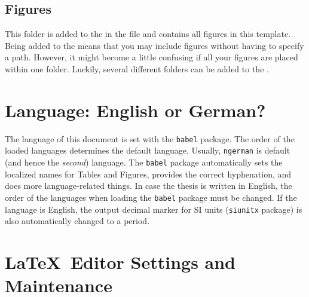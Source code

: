 \subsection{Figures}
This folder is added to the  in the  file and contains all figures in this template. Being added to the  means that you may include figures without having to specify a path. However, it might become a little confusing if all your figures are placed within one folder. Luckily, several different folders can be added to the .
\section{Language: English or German?}\label{sec:language}
The language of this document is set with the \verb+babel+ package. The order of the loaded languages determines the default language. Usually, \verb+ngerman+ is default (and hence the \emph{second}) language. The \verb+babel+ package automatically sets the localized names for Tables and Figures, provides the correct hyphenation, and does more language-related things. In case the thesis is written in English, the order of the languages when loading the \verb+babel+ package must be changed. If the language is English, the output decimal marker for SI units (\verb+siunitx+ package) is also automatically changed to a period.
\section{\LaTeX\ Editor Settings and Maintenance}
